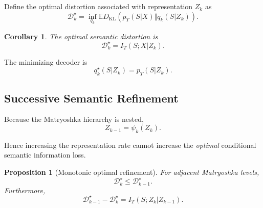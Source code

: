 \documentclass[11pt]{article}
\newtheorem{proposition}{Proposition}
\newtheorem{corollary}{Corollary}
\newcommand{\KL}{D_{\mathrm{KL}}}
\newcommand{\E}{\mathbb{E}}
\newcommand{\cD}{\mathcal{D}}
\begin{document}
Define the optimal distortion associated with representation $Z_k$ as
\begin{equation}
    \cD_k^\star
    =
    \inf_{q_k}
    \E
    \KL
    \left(
        p_T(S|X)
        \Vert
        q_k(S|Z_k)
    \right).
\end{equation}

\begin{corollary}
The optimal semantic distortion is
\begin{equation}
\boxed{
    \cD_k^\star
    =
    I_T(S;X|Z_k).
}
\label{eq:optimal-distortion}
\end{equation}
\end{corollary}

The minimizing decoder is
\begin{equation}
    q_k^\star(S|Z_k)=p_T(S|Z_k).
\end{equation}


\subsection{Successive Semantic Refinement}

Because the Matryoshka hierarchy is nested,
\begin{equation}
    Z_{k-1}=\psi_k(Z_k).
\end{equation}

Hence increasing the representation rate cannot increase the \emph{optimal} conditional semantic information loss.

\begin{proposition}[Monotonic optimal refinement]
For adjacent Matryoshka levels,
\begin{equation}
\boxed{
    \cD_k^\star
    \leq
    \cD_{k-1}^\star.
}
\end{equation}
Furthermore,
\begin{equation}
\boxed{
    \cD_{k-1}^\star-\cD_k^\star
    =
    I_T(S;Z_k|Z_{k-1}).
}
\label{eq:refinement-gain}
\end{equation}
\end{proposition}
\end{document}
